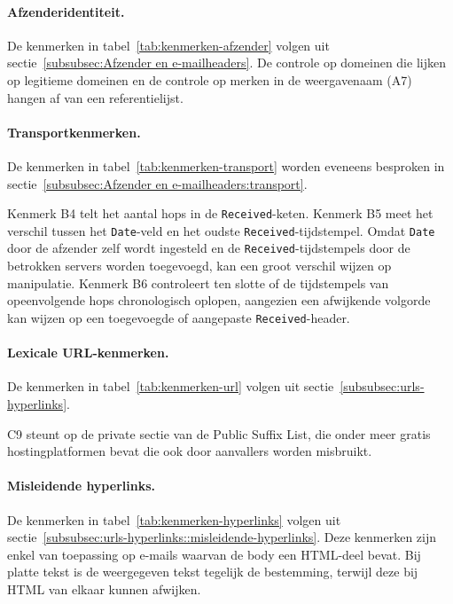 \paragraph{Afzenderidentiteit.}
De kenmerken in tabel~\ref{tab:kenmerken-afzender} volgen uit sectie~\ref{subsubsec:Afzender en e-mailheaders}. De controle op domeinen die lijken op legitieme domeinen en de controle op merken in de weergavenaam (A7) hangen af van een referentielijst.



\paragraph{Transportkenmerken.}
De kenmerken in tabel~\ref{tab:kenmerken-transport} worden eveneens besproken in sectie~\ref{subsubsec:Afzender en e-mailheaders:transport}.



Kenmerk B4 telt het aantal hops in de \texttt{Received}-keten. Kenmerk B5 meet het verschil tussen het \texttt{Date}-veld en het oudste \texttt{Received}-tijdstempel. Omdat \texttt{Date} door de afzender zelf wordt ingesteld en de \texttt{Received}-tijdstempels door de betrokken servers worden toegevoegd, kan een groot verschil wijzen op manipulatie. Kenmerk B6 controleert ten slotte of de tijdstempels van opeenvolgende hops chronologisch oplopen, aangezien een afwijkende volgorde kan wijzen op een toegevoegde of aangepaste \texttt{Received}-header.

\paragraph{Lexicale URL-kenmerken.}
De kenmerken in tabel~\ref{tab:kenmerken-url} volgen uit sectie~\ref{subsubsec:urls-hyperlinks}.



C9 steunt op de private sectie van de Public Suffix List, die onder meer gratis hostingplatformen bevat die ook door aanvallers worden misbruikt.

\paragraph{Misleidende hyperlinks.}
De kenmerken in tabel~\ref{tab:kenmerken-hyperlinks} volgen uit sectie~\ref{subsubsec:urls-hyperlinks::misleidende-hyperlinks}.
Deze kenmerken zijn enkel van toepassing op e-mails waarvan de body een HTML-deel bevat. Bij platte tekst is de weergegeven tekst tegelijk de bestemming, terwijl deze bij HTML van elkaar kunnen afwijken. 

